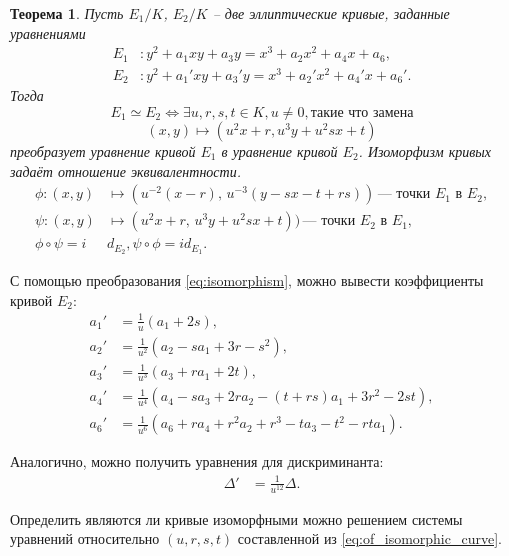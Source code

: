 \documentclass[12pt]{article}
\newtheorem{theorem}{Теорема}
\theoremstyle{definition}
\theoremstyle{definition}
\theoremstyle{definition}
\begin{document}
\begin{theorem}
\label{th:isomorphisms}
Пусть $E_1/K$, $E_2/K$ -- две эллиптические кривые, заданные уравнениями 
\begin{equation}
\label{eq:isom_E1_E2}
	\begin{split}
	E_1&: y^2+a_1xy + a_3y = x^3 + a_2x^2 + a_4x + a_6, \\
	E_2&: y^2+a_1'xy + a_3'y = x^3 + a_2'x^2 + a_4'x + a_6'.
	\end{split}
\end{equation}
Тогда
\begin{equation*}
E_1 \simeq E_2 \iff \exists u,r,s,t \in K, u\neq0, \text{такие что замена}
	\end{equation*}
	\begin{equation}
	\label{eq:isomorphism}
	(x,y) \mapsto (u^2x+r, u^3y+ u^2sx+t)
	\end{equation}
	преобразует уравнение кривой $E_1$ в уравнение кривой $E_2$. Изоморфизм кривых задаёт отношение эквивалентности.
	\begin{align*}
	\phi : (x,y)&\mapsto (u^{-2}(x-r), \,u^{-3}(y-sx-t+rs))\,\text{— точки $E_1$ в $E_2$}, \\
	\psi : (x,y)&\mapsto (u^2x+r, \,u^3y+u^2sx+t))\, \text{— точки $E_2$ в $E_1$}, \\
	\phi \circ \psi = i&d_{E_2}, \psi \circ \phi = id_{E_1}.
	\end{align*}
\end{theorem}

С помощью преобразования \eqref{eq:isomorphism}, можно вывести коэффициенты кривой $E_2$:
\begin{equation}
\label{eq:of_isomorphic_curve}
\begin{split}
a_1' &= \frac{1}{u}(a_1+2s), \\ 
a_2' &= \frac{1}{u^2}(a_2-sa_1+3r-s^2), \\
a_3' &= \frac{1}{u^3}(a_3+ra_1+2t), \\
a_4' &= \frac{1}{u^4}(a_4 - sa_3 + 2ra_2 - (t+rs)a_1 + 3r^2 - 2st), \\
a_6' &= \frac{1}{u^6}(a_6 + ra_4 + r^2a_2 + r^3 - ta_3 - t^2 - rta_1).
\end{split}
\end{equation}

Аналогично, можно получить уравнения для дискриминанта:
\begin{align*}
\Delta' &= \frac{1}{u^{12}}\Delta.
\end{align*}

Определить являются ли кривые изоморфными можно
решением системы уравнений относительно $(u,r,s,t)$ составленной из \eqref{eq:of_isomorphic_curve}.
\end{document}
